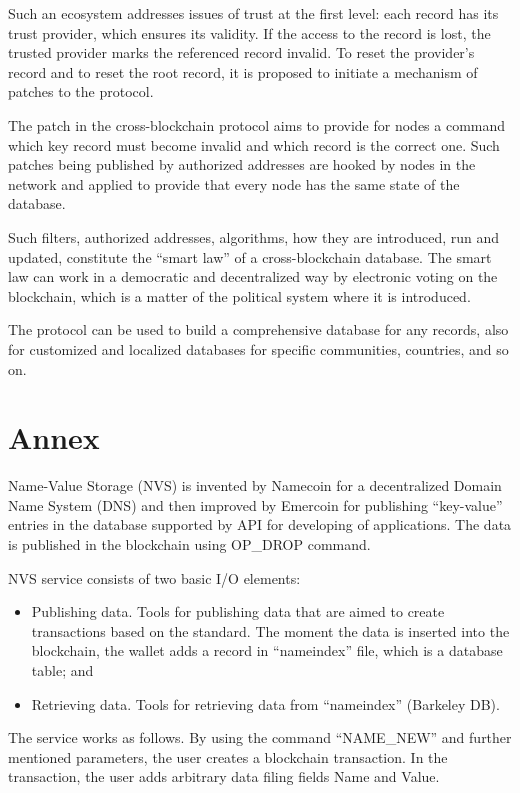 \begin{multicols}{2}
Such an ecosystem addresses issues of trust at the first level: each record has its trust provider, which ensures its validity. If the access to the record is lost, the trusted provider marks the referenced record invalid. To reset the provider’s record and to reset the root record, it is proposed to initiate a mechanism of patches to the protocol. 

The patch in the cross-blockchain protocol aims to provide for nodes a command which key record must become invalid and which record is the correct one. Such patches being published by authorized addresses are hooked by nodes in the network and applied to provide that every node has the same state of the database.

Such filters, authorized addresses, algorithms, how they are introduced, run and updated, constitute the “smart law” of a cross-blockchain database. The smart law can work in a democratic and decentralized way by electronic voting on the blockchain, which is a matter of the political system where it is introduced.

The protocol can be used to build a comprehensive database for any records, also for customized and localized databases for specific communities, countries, and so on.

\vspace{-.4cm}

\section*{Annex}

Name-Value Storage (NVS) is invented by Namecoin for a decentralized Domain Name System (DNS) and then improved by Emercoin for publishing “key-value” entries in the database supported by API for developing of applications. The data is published in the blockchain using OP\_DROP command.

NVS service consists of two basic I/O elements:
\begin{itemize}
\item[(1)] Publishing data. Tools for publishing data that are aimed to create transactions based on the standard. The moment the data is inserted into the blockchain, the wallet adds a record in “nameindex” file, which is a database table; and
\item[(2)] Retrieving data. Tools for retrieving data from “nameindex” (Barkeley DB).
\end{itemize}

The service works as follows. By using the command “NAME\_NEW” and further mentioned parameters, the user creates a blockchain transaction. In the transaction, the user adds arbitrary data filing fields Name and Value.


\end{multicols}
